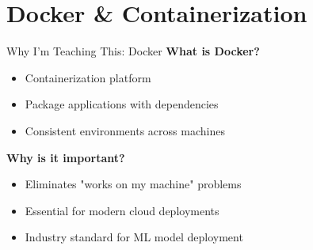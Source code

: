 \documentclass[../main.tex]{subfiles}
\begin{document}
\section{Docker \& Containerization}

\begin{frame}{Why I'm Teaching This: Docker}
    \textbf{What is Docker?}
    \begin{itemize}
        \item Containerization platform
        \item Package applications with dependencies
        \item Consistent environments across machines
    \end{itemize}

    \bigskip

    \textbf{Why is it important?}
    \begin{itemize}
        \item Eliminates "works on my machine" problems
        \item Essential for modern cloud deployments
        \item Industry standard for ML model deployment
    \end{itemize}
\end{frame}
\end{document}
